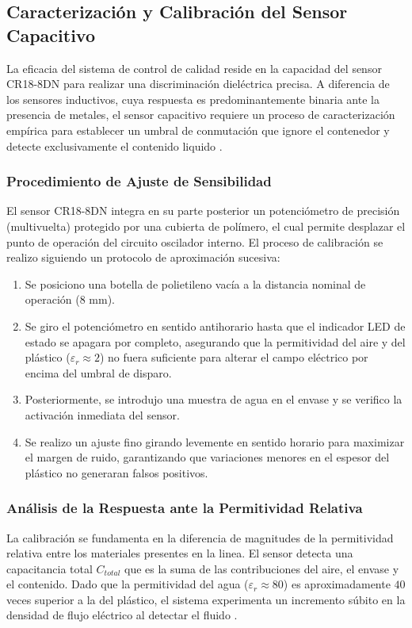 \documentclass[conference]{IEEEtran}
\begin{document}
\subsection{Caracterización y Calibración del Sensor Capacitivo}

La eficacia del sistema de control de calidad reside en la capacidad del sensor CR18-8DN para realizar una discriminación dieléctrica precisa. A diferencia de los sensores inductivos, cuya respuesta es predominantemente binaria ante la presencia de metales, el sensor capacitivo requiere un proceso de caracterización empírica para establecer un umbral de conmutación que ignore el contenedor y detecte exclusivamente el contenido liquido \cite{sensores_16}.

\subsubsection{Procedimiento de Ajuste de Sensibilidad}
El sensor CR18-8DN integra en su parte posterior un potenciómetro de precisión (multivuelta) protegido por una cubierta de polímero, el cual permite desplazar el punto de operación del circuito oscilador interno. El proceso de calibración se realizo siguiendo un protocolo de aproximación sucesiva:
\begin{enumerate}
    \item Se posiciono una botella de polietileno vacía a la distancia nominal de operación ($8$ mm).
    \item Se giro el potenciómetro en sentido antihorario hasta que el indicador LED de estado se apagara por completo, asegurando que la permitividad del aire y del plástico ($\varepsilon_r \approx 2$) no fuera suficiente para alterar el campo eléctrico por encima del umbral de disparo.
    \item Posteriormente, se introdujo una muestra de agua en el envase y se verifico la activación inmediata del sensor. 
    \item Se realizo un ajuste fino girando levemente en sentido horario para maximizar el margen de ruido, garantizando que variaciones menores en el espesor del plástico no generaran falsos positivos.
\end{enumerate}

\subsubsection{Análisis de la Respuesta ante la Permitividad Relativa}
La calibración se fundamenta en la diferencia de magnitudes de la permitividad relativa entre los materiales presentes en la linea. El sensor detecta una capacitancia total $C_{total}$ que es la suma de las contribuciones del aire, el envase y el contenido. Dado que la permitividad del agua ($\varepsilon_r \approx 80$) es aproximadamente $40$ veces superior a la del plástico, el sistema experimenta un incremento súbito en la densidad de flujo eléctrico al detectar el fluido \cite{sensores_18}.
\end{document}
